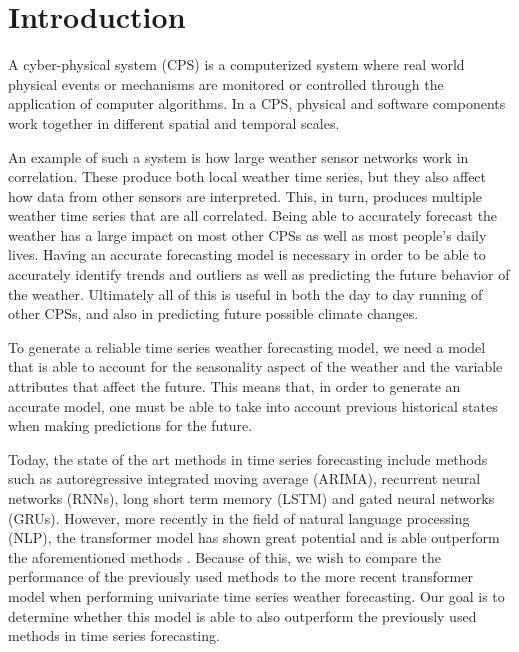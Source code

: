 \section{Introduction}
\label{sec:intro}
A cyber-physical system (CPS) is a computerized system where real world physical events or mechanisms are monitored or controlled through the application of computer algorithms.
In a CPS, physical and software components work together in different spatial and temporal scales.

An example of such a system is how large weather sensor networks work in correlation. These produce both local weather time series, but they also affect how data from other sensors are interpreted. This, in turn, produces multiple weather time series that are all correlated. Being able to accurately forecast the weather has a large impact on most other CPSs as well as most people's daily lives. Having an accurate forecasting model is necessary in order to be able to accurately identify trends and outliers as well as predicting the future behavior of the weather. Ultimately all of this is useful in both the day to day running of other CPSs, and also in predicting future possible climate changes. 

To generate a reliable time series weather forecasting model, we need a model that is able to account for the seasonality aspect of the weather and the variable attributes that affect the future. 
This means that, in order to generate an accurate model, one must be able to take into account previous historical states when making predictions for the future. 

Today, the state of the art methods in time series forecasting include methods such as autoregressive integrated moving average (ARIMA), recurrent neural networks (RNNs), long short term memory (LSTM) and gated neural networks
(GRUs).
However, more recently in the field of natural language processing (NLP), the transformer model has shown great potential and is able outperform the aforementioned methods \cite{AttentionIsAllYouNeed}.
Because of this, we wish to compare the performance of the previously used methods to the more recent transformer model when performing univariate time series weather forecasting. Our goal is to determine whether this model is able to also outperform the previously used methods in time series forecasting.

